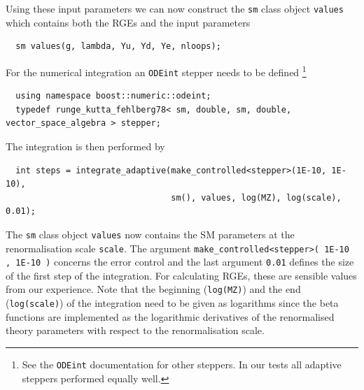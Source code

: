 \documentclass[11pt,a4paper]{article}
\begin{document}
Using these input parameters we can now construct the \texttt{sm} class object \texttt{values} which contains both the RGEs and the input parameters
\begin{lstlisting}
  sm values(g, lambda, Yu, Yd, Ye, nloops);
\end{lstlisting}

For the numerical integration an \texttt{ODEint} stepper needs to be defined \footnote{See the \texttt{ODEint} documentation for other steppers. In our tests all adaptive steppers performed equally well.}
\begin{lstlisting}
  using namespace boost::numeric::odeint;
  typedef runge_kutta_fehlberg78< sm, double, sm, double, vector_space_algebra > stepper;
\end{lstlisting}
The integration is then performed by
\begin{lstlisting}
  int steps = integrate_adaptive(make_controlled<stepper>(1E-10, 1E-10),
                                 sm(), values, log(MZ), log(scale), 0.01);
\end{lstlisting}
The \texttt{sm} class object \texttt{values} now contains the SM parameters at the renormalisation scale \texttt{scale}. The argument \texttt{make\_controlled<stepper>( 1E-10 , 1E-10 )} concerns the error control
and the last argument \texttt{0.01} defines the size of the first step of the integration. For calculating RGEs, these are sensible values from our experience.
Note that the beginning (\texttt{log(MZ)}) and the end (\texttt{log(scale)}) of the integration need to be given as logarithms since the beta functions are implemented as the logarithmic derivatives of the
renormalised theory parameters with respect to the renormalisation scale.
\end{document}

